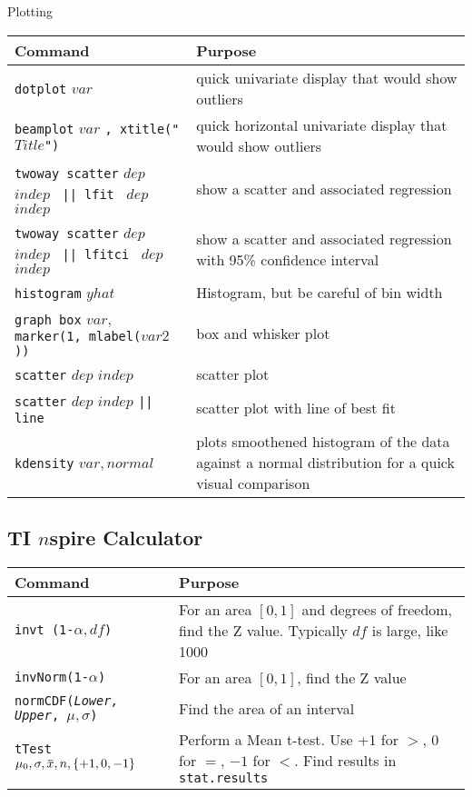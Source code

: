 \documentclass[11pt, oneside]{article}   	%
\newcommand{\overbar}[1]{\mkern 1.5mu\overline{\mkern-1.5mu#1\mkern-1.5mu}\mkern 1.5mu}
\begin{document}
\begin{center}
\large{Plotting}
\end{center}

\begin{tabular}{l p{ } }
Command & Purpose \\
\hline
\texttt{dotplot} $var$ & quick univariate display that would show outliers \\ 

\texttt{beamplot} $var$ \texttt{, xtitle("$Title$")} & quick horizontal univariate display that would show outliers \\ 


\texttt{twoway scatter} $dep$ $indep$ \texttt{  || lfit } $dep$ $indep$ & show a scatter and associated regression\\ 

\texttt{twoway scatter} $dep$ $indep$ \texttt{  || lfitci } $dep$ $indep$ & show a scatter and associated regression with 95\% confidence interval\\ 

\texttt{histogram} $yhat$ & Histogram, but be careful of bin width  \\

\texttt{graph box} $var,$ \texttt{ marker(1, mlabel($var2$)) } &  box and whisker plot\\

\texttt{scatter} $dep$ $indep$ & scatter plot \\

\texttt{scatter} $dep$ $indep$ \texttt{|| line } & scatter plot with line of best fit \\

\texttt{kdensity} $var, normal$ & plots smoothened histogram of the data against a normal distribution for a quick visual comparison \\

\end{tabular}




\break
\subsection{TI $n$spire Calculator}
\begin{tabular}{l p{ } }
Command & Purpose \\
\hline
\texttt{invt (1-$\alpha, df$)} & For an area $[0,1]$ and degrees of freedom, find the Z value. Typically $df$ is large, like 1000\\

\texttt{invNorm(1-$\alpha$)} & For an area $[0,1]$, find the Z value \\

\texttt{normCDF(\textit{Lower, Upper}, $\mu, \sigma$)} & Find the area of an interval \\

\texttt{tTest $\mu_0, \sigma, \overbar{x}, n, \{+1,0,-1\}$ } & Perform a Mean t-test. Use +1 for $>$, 0 for $=$, $-1$ for $<$. Find results in \texttt{stat.results} \\



\end{tabular}
\end{document}
